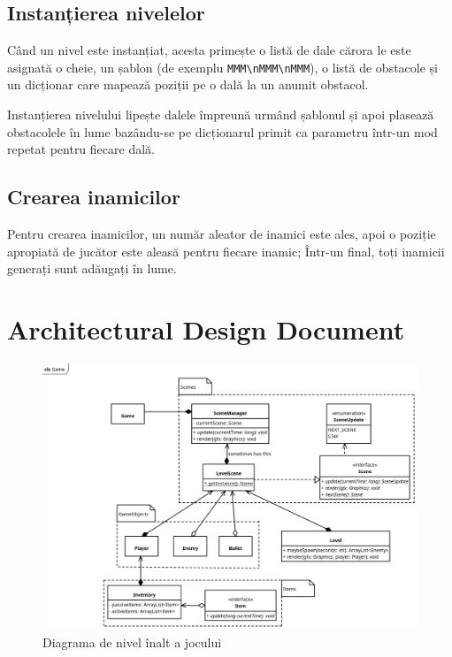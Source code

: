 \documentclass{article}
\begin{document}
    \subsection{Instanțierea nivelelor}

    Când un nivel este instanțiat, acesta primește o listă de dale cărora le este asignată o cheie,
    un șablon (de exemplu \texttt{MMM\textbackslash nMMM\textbackslash nMMM}), o listă de obstacole
    și un dicționar care mapează poziții pe o dală la un anumit obstacol.

    Instanțierea nivelului lipește dalele împreună urmând șablonul și apoi plasează obstacolele în
    lume bazându-se pe dicționarul primit ca parametru într-un mod repetat pentru fiecare dală.

    \subsection{Crearea inamicilor}

    Pentru crearea inamicilor, un număr aleator de inamici este ales, apoi o poziție apropiată de
    jucător este aleasă pentru fiecare inamic; Într-un final, toți inamicii generați sunt adăugați
    în lume.


    \section{Architectural Design Document}
    \FloatBarrier
    \begin{figure}[H]
        \includegraphics[width=\linewidth]{high-level-diagram}
        \centering
        \caption{Diagrama de nivel înalt a jocului}
    \end{figure}
\end{document}

